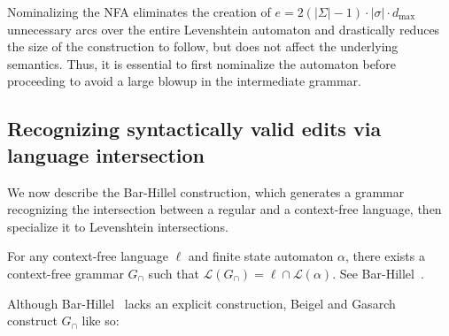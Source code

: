 \documentclass[sigplan,review,acmsmall,nonacm,anonymous]{acmart}\settopmatter{printfolios=false,printccs=false,printacmref=false}
\begin{document}

  Nominalizing the NFA eliminates the creation of $e=2(|\Sigma| - 1)\cdot|\sigma|\cdot d_\max$ unnecessary arcs over the entire Levenshtein automaton and drastically reduces the size of the construction to follow, but does not affect the underlying semantics. Thus, it is essential to first nominalize the automaton before proceeding to avoid a large blowup in the intermediate grammar.

  \subsection{Recognizing syntactically valid edits via language intersection}\label{sec:lev_bh}

  We now describe the Bar-Hillel construction, which generates a grammar recognizing the intersection between a regular and a context-free language, then specialize it to Levenshtein intersections.

  \begin{lemma}\label{lemma:bar-hillel}
  For any context-free language $\ell$ and finite state automaton $\alpha$, there exists a context-free grammar $G_\cap$ such that $\mathcal{L}(G_\cap) = \ell \cap \mathcal{L}(\alpha)$. See Bar-Hillel~\cite{bar1961formal}.
  \end{lemma}

  \noindent Although Bar-Hillel~\cite{bar1961formal} lacks an explicit construction, Beigel and Gasarch~\cite{beigelproof} construct $G_\cap$ like so:\vspace{-2pt}
\end{document}
